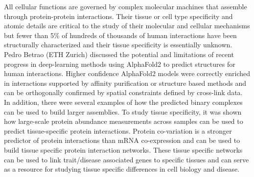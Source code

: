 All cellular functions are governed by complex molecular machines that assemble through protein-protein interactions. Their tissue or cell type specificity and atomic details are critical to the study of their molecular and cellular mechanisms but fewer than 5\% of hundreds of thousands of human interactions have been structurally characterized and their tissue specificity is essentially unknown. Pedro Betrao (ETH Zurich) discussed the potential and limitations of recent progress in deep-learning methods using AlphaFold2 to predict structures for human interactions. Higher confidence AlphaFold2 models were correctly enriched in interactions supported by affinity purification or structure based methods and can be orthogonally confirmed by spatial constraints defined by cross-link data. In addition, there were several examples of how the predicted binary complexes can be used to build larger assemblies. To study tissue specificity, it was shown how large-scale protein abundance measurements across samples can be used to predict tissue-specific protein interactions. Protein co-variation is a stronger predictor of protein interactions than mRNA co-expression and can be used to build tissue specific protein interaction networks. These tissue specific networks can be used to link trait/disease associated genes to specific tissues and can serve as a resource for studying tissue specific differences in cell biology and disease.


